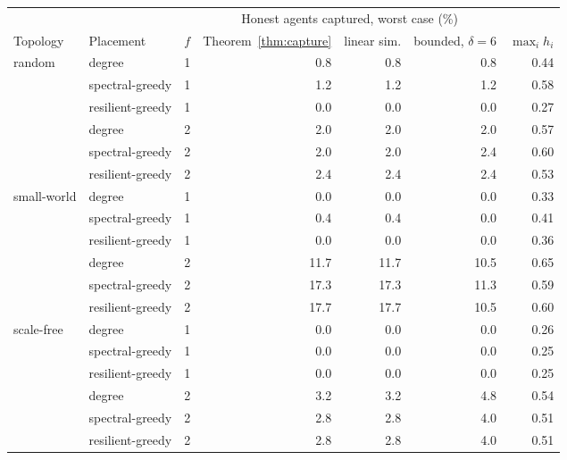 \begin{tabular}{llrrrrr}
\toprule
 & & & \multicolumn{3}{c}{Honest agents captured, worst case (\%)} & \\
\cmidrule(lr){4-6}
Topology & Placement & $f$ & Theorem~\ref{thm:capture} & linear sim. & bounded, $\delta=6$ & $\max_i h_i$ \\
\midrule
random & degree & 1 & 0.8 & 0.8 & 0.8 & 0.44 \\
 & spectral-greedy & 1 & 1.2 & 1.2 & 1.2 & 0.58 \\
 & resilient-greedy & 1 & 0.0 & 0.0 & 0.0 & 0.27 \\
 & degree & 2 & 2.0 & 2.0 & 2.0 & 0.57 \\
 & spectral-greedy & 2 & 2.0 & 2.0 & 2.4 & 0.60 \\
 & resilient-greedy & 2 & 2.4 & 2.4 & 2.4 & 0.53 \\
\addlinespace
small-world & degree & 1 & 0.0 & 0.0 & 0.0 & 0.33 \\
 & spectral-greedy & 1 & 0.4 & 0.4 & 0.0 & 0.41 \\
 & resilient-greedy & 1 & 0.0 & 0.0 & 0.0 & 0.36 \\
 & degree & 2 & 11.7 & 11.7 & 10.5 & 0.65 \\
 & spectral-greedy & 2 & 17.3 & 17.3 & 11.3 & 0.59 \\
 & resilient-greedy & 2 & 17.7 & 17.7 & 10.5 & 0.60 \\
\addlinespace
scale-free & degree & 1 & 0.0 & 0.0 & 0.0 & 0.26 \\
 & spectral-greedy & 1 & 0.0 & 0.0 & 0.0 & 0.25 \\
 & resilient-greedy & 1 & 0.0 & 0.0 & 0.0 & 0.25 \\
 & degree & 2 & 3.2 & 3.2 & 4.8 & 0.54 \\
 & spectral-greedy & 2 & 2.8 & 2.8 & 4.0 & 0.51 \\
 & resilient-greedy & 2 & 2.8 & 2.8 & 4.0 & 0.51 \\
\bottomrule
\end{tabular}
